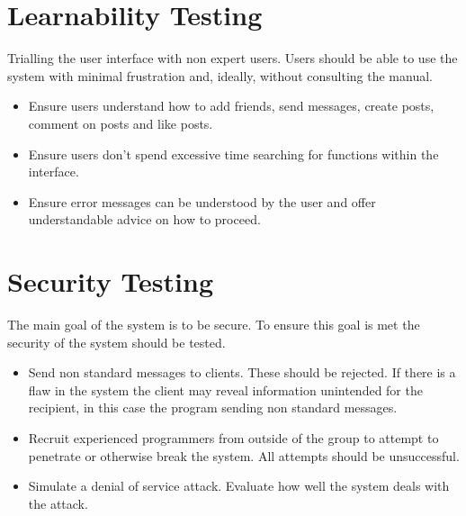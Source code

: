 \section{Learnability Testing}
Trialling the user interface with non expert users. Users should be able to use
the system with minimal frustration and, ideally, without consulting the manual.
\begin{itemize}
\item Ensure users understand how to add friends, send messages, create posts, 
comment on posts and like posts.
\item Ensure users don't spend excessive time searching for functions within the
interface.
\item Ensure error messages can be understood by the user and offer 
understandable advice on how to proceed.
\end{itemize}

\section{Security Testing}
The main goal of the system is to be secure. To ensure this goal is met the 
security of the system should be tested.
\begin{itemize}
\item Send non standard messages to clients. These should be rejected. If there 
is a flaw in the system the client may reveal information unintended for the 
recipient, in this case the program sending non standard messages.
\item Recruit experienced programmers from outside of the group to attempt to 
penetrate or otherwise break the system. All attempts should be unsuccessful.
\item Simulate a denial of service attack. Evaluate how well the system deals 
with the attack.
\end{itemize}
